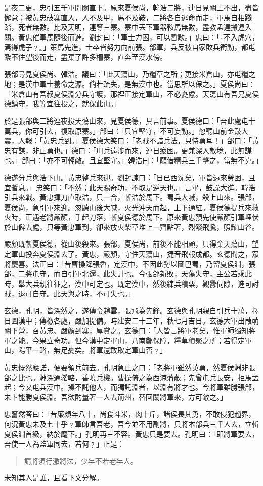 是夜二更，忠引五千軍開關直下。原來夏侯尚，韓浩二將，連日見關上不出，盡皆懈怠；被黃忠破寨直入，人不及甲，馬不及鞍，二將各自逃命而走，軍馬自相踐踏，死者無數。比及天明，連奪三寨。寨中丟下軍器鞍馬無數，盡教孟達搬運入關。黃忠催軍馬隨後而進。劉封曰：「軍士力困，可以暫歇。」忠曰：「『不入虎穴，焉得虎子﹖』」策馬先進，士卒皆努力向前張。郃軍，兵反被自家敗兵衝動，都屯紮不住望後而走，盡棄了許多柵寨，直奔至漢水傍。

張郃尋見夏侯尚、韓浩。議曰：「此天蕩山，乃糧草之所；更接米倉山，亦屯糧之地；是漢中軍士養命之源。倘若疏失，是無漢中也。當思所以保之。」夏侯尚曰：「米倉山有吾叔夏侯淵分兵守護，那裡正接定軍山，不必憂慮。天蕩山有吾兄夏侯德鎮守，我等宜往投之，就保此山。」

於是張郃與二將連夜投天蕩山來，見夏侯德，具言前事。夏侯德曰：「吾此處屯十萬兵，你可引去，復取原寨。」郃曰：「只宜堅守，不可妄動。」忽聽山前金鼓大震，人報：「黃忠兵到。」夏侯德大笑曰：「老賊不諳兵法，只恃勇耳！」郃曰：「黃忠有謀，非止勇也。」德曰：「川兵遠涉而來，連日疲困。更兼深入敵境，此無謀也。」郃曰：「亦不可輕敵。且宜堅守。」韓浩曰：「願借精兵三千擊之，當無不克。」

德遂分兵與浩下山。黃忠整兵來迎。劉封諫曰：「日已西沈矣，軍皆遠來勞困，且宜暫息。」忠笑曰：「不然；此天賜奇功，不取是逆天也。」言畢，鼓譟大進。韓浩引兵來戰。黃忠揮刀直取浩，只一合，斬浩於馬下。蜀兵大喊，殺上山來。張郃，夏侯尚，急引軍來迎。忽聽山後大喊，火光沖天而起，上下通紅。夏侯德提兵來救火時，正遇老將嚴顏，手起刀落，斬夏侯德於馬下。原來黃忠預先使嚴顏引軍埋伏於山僻去處，只等黃忠軍到，卻來放火柴草堆上一齊點著，烈燄飛騰，照耀山谷。

嚴顏既斬夏侯德，從山後殺來。張郃，夏侯尚，前後不能相顧，只得棄天蕩山，望定軍山投奔夏侯淵去了。黃忠，嚴顏，守住天蕩山，捷音飛報成都。玄德聞之，眾將慶喜。法正曰：「昔曹操降張魯，定漢中，不因此勢以圖巴蜀，乃留夏侯淵，張郃，二將屯守，而自引軍北還，此失計也。今張郃新敗，天蕩失守，主公若乘此時，舉大兵親往征之，漢中可定也。既定漢中，然後練兵積粟，觀釁伺隙，進可討賊，退可自守。此天與之時，不可失也。」

玄德，孔明，皆深然之，遂傳令趙雲，張飛為先鋒。玄德與孔明親自引兵十萬，擇日圖漢中；傳檄各處，嚴加提備。時建安二十三年，秋七月吉日。玄德大軍出葭萌關下營，召黃忠、嚴顏到寨，厚賞之。玄德曰：「人皆言將軍老矣，惟軍師獨知將軍之能。今果立奇功。但今漢中定軍山，乃南鄭保障，糧草積聚之所；若得定軍山，陽平一路，無足憂矣。將軍還敢取定軍山否﹖」

黃忠慨然應諾，便要領兵前去。孔明急止之曰：「老將軍雖然英勇，然夏侯淵非張郃之比也。淵深通韜略，善曉兵機。曹操倚之為西涼藩蔽；先曾屯兵長安，拒馬孟起；今又屯兵漢中。操不託他人，而獨託淵者，以淵有將才也。今將軍雖勝張郃，未卜能勝夏侯淵。吾欲酌量著一人去荊州，替回關將軍來，方可敵之。」

忠奮然答曰：「昔廉頗年八十，尚食斗米，肉十斤，諸侯畏其勇，不敢侵犯趙界，何況黃忠未及七十乎﹖軍師言吾老，吾今並不用副將，只將本部兵三千人去，立斬夏侯淵首級，納於麾下。」孔明再三不容。黃忠只是要去。孔明曰：「即將軍要去，吾使一人為監軍同去，若何﹖」正是：

\begin{quote}
請將須行激將法，少年不若老年人。
\end{quote}

未知其人是誰，且看下文分解。
